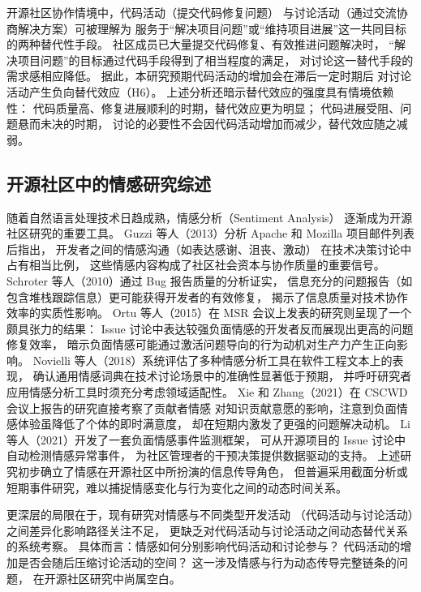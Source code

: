 \documentclass[
    type = master, %
    degree = professional,        %
    decl-page,  %
    twoside,                %
    fontset = fandol %
  ]{njuthesis}
\begin{document}
开源社区协作情境中，代码活动（提交代码修复问题）
与讨论活动（通过交流协商解决方案）可被理解为
服务于“解决项目问题”或“维持项目进展”这一共同目标的两种替代性手段。
社区成员已大量提交代码修复、有效推进问题解决时，
“解决项目问题”的目标通过代码手段得到了相当程度的满足，
对讨论这一替代手段的需求感相应降低。
据此，本研究预期代码活动的增加会在滞后一定时期后
对讨论活动产生负向替代效应（H6）。
上述分析还暗示替代效应的强度具有情境依赖性：
代码质量高、修复进展顺利的时期，替代效应更为明显；
代码进展受阻、问题悬而未决的时期，
讨论的必要性不会因代码活动增加而减少，替代效应随之减弱。

\subsection{开源社区中的情感研究综述}

随着自然语言处理技术日趋成熟，情感分析（Sentiment Analysis）
逐渐成为开源社区研究的重要工具。
Guzzi 等人（2013）分析 Apache 和 Mozilla 项目邮件列表后指出，
开发者之间的情感沟通（如表达感谢、沮丧、激动）
在技术决策讨论中占有相当比例，
这些情感内容构成了社区社会资本与协作质量的重要信号\cite{guzzi2013}。
Schroter 等人（2010）通过 Bug 报告质量的分析证实，
信息充分的问题报告（如包含堆栈跟踪信息）更可能获得开发者的有效修复，
揭示了信息质量对技术协作效率的实质性影响\cite{schroter2010}。
Ortu 等人（2015）在 MSR 会议上发表的研究则呈现了一个颇具张力的结果：
Issue 讨论中表达较强负面情感的开发者反而展现出更高的问题修复效率，
暗示负面情感可能通过激活问题导向的行为动机对生产力产生正向影响\cite{ortu2015bullies}。
Novielli 等人（2018）系统评估了多种情感分析工具在软件工程文本上的表现，
确认通用情感词典在技术讨论场景中的准确性显著低于预期，
并呼吁研究者应用情感分析工具时须充分考虑领域适配性\cite{novielli2018sentiment}。
Xie 和 Zhang（2021）在 CSCWD 会议上报告的研究直接考察了贡献者情感
对知识贡献意愿的影响，注意到负面情感体验虽降低了个体的即时满意度，
却在短期内激发了更强的问题解决动机\cite{xie2021influence}。
Li 等人（2021）开发了一套负面情感事件监测框架，
可从开源项目的 Issue 讨论中自动检测情感异常事件，
为社区管理者的干预决策提供数据驱动的支持\cite{li2021monitoring}。
上述研究初步确立了情感在开源社区中所扮演的信息传导角色，
但普遍采用截面分析或短期事件研究，难以捕捉情感变化与行为变化之间的动态时间关系。

更深层的局限在于，现有研究对情感与不同类型开发活动
（代码活动与讨论活动）之间差异化影响路径关注不足，
更缺乏对代码活动与讨论活动之间动态替代关系的系统考察。
具体而言：情感如何分别影响代码活动和讨论参与？
代码活动的增加是否会随后压缩讨论活动的空间？
这一涉及情感与行为动态传导完整链条的问题，
在开源社区研究中尚属空白。
\end{document}
